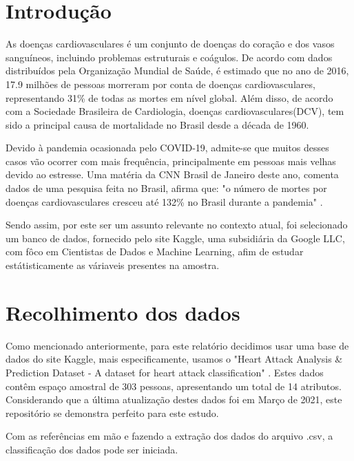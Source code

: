 \chapter*[Introdução]{Introdução}


    As doenças cardiovasculares é um conjunto de doenças do coração e dos vasos sanguíneos, incluindo 
    problemas estruturais e coágulos. De acordo com dados distribuídos pela Organização Mundial de Saúde\cite{oms},
    é estimado que no ano de 2016, 17.9 milhões de pessoas morreram por conta de doenças cardiovasculares, 
    representando 31\% de todas as mortes em nível global. Além disso, de acordo com a Sociedade Brasileira
    de Cardiologia, doenças cardiovasculares(DCV), tem sido a principal causa de mortalidade no Brasil desde a década de 1960.

    Devido à pandemia ocasionada pelo COVID-19, admite-se que muitos desses casos vão ocorrer
    com mais frequência, principalmente em pessoas mais velhas devido ao estresse. Uma matéria da 
    CNN Brasil de Janeiro deste ano, comenta dados de uma pesquisa feita no Brasil, afirma 
    que: "o número de mortes por doenças cardiovasculares cresceu até 132\% no Brasil durante a pandemia"
    \cite{abccardiol}.

    Sendo assim, por este ser um assunto relevante no contexto atual, foi selecionado um banco de 
    dados, fornecido pelo site Kaggle, uma subsidiária da Google LLC, com fôco em Cientistas 
    de Dados e Machine Learning, afim de estudar estátisticamente as váriaveis presentes na amostra.

    \newpage
    \chapter{Recolhimento dos dados}

    Como mencionado anteriormente, para este relatório decidimos usar uma base de dados do 
    site Kaggle, mais especificamente, usamos o "Heart Attack Analysis \& Prediction Dataset
     - A dataset for heart attack classification" \cite{bancodedados}. Estes dados contêm 
    espaço amostral de 303 pessoas, apresentando um total de 14 atributos. Considerando que a
    última atualização destes dados foi em Março de 2021, este repositório se demonstra 
    perfeito para este estudo.

    Com as referências em mão e fazendo a extração dos dados do arquivo .csv, a classificação
    dos dados pode ser iniciada.

    \newpage